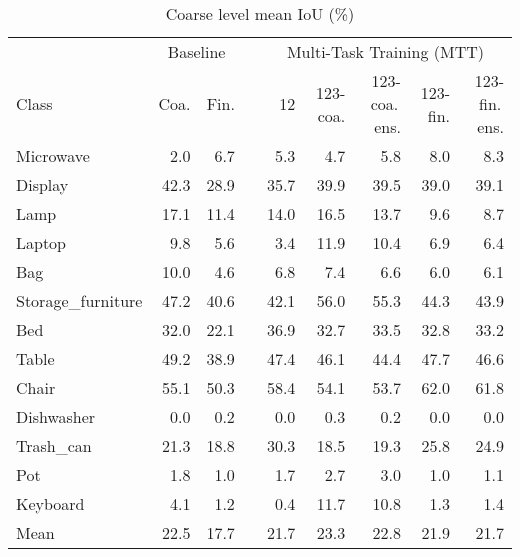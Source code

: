 \begin{table}[!h]
\caption{Coarse level mean IoU (\%)}
\centering
\begin{tabular}{lrrrrrrrr}
\toprule
 &  \multicolumn{2}{c}{Baseline} && \multicolumn{5}{c}{Multi-Task Training (MTT)} \\
 \cmidrule{2-3}
 \cmidrule{5-9}
Class 			  &  	 Coa. &  				Fin. &&  	12 &  		123-coa. &  		123-coa.\,ens. &  	  123-fin. &  123-fin.\,ens. \\
\midrule
Microwave         &       2.0 &                  6.7 &&     5.3 &             4.7 &                     5.8 &           8.0 &                   8.3 \\
Display           &      42.3 &                 28.9 &&    35.7 &            39.9 &                    39.5 &          39.0 &                  39.1 \\
Lamp              &      17.1 &                 11.4 &&    14.0 &            16.5 &                    13.7 &           9.6 &                   8.7 \\
Laptop            &       9.8 &                  5.6 &&     3.4 &            11.9 &                    10.4 &           6.9 &                   6.4 \\
Bag               &      10.0 &                  4.6 &&     6.8 &             7.4 &                     6.6 &           6.0 &                   6.1 \\
Storage\_furniture &      47.2 &                 40.6 &&    42.1 &            56.0 &                    55.3 &          44.3 &                  43.9 \\
Bed               &      32.0 &                 22.1 &&    36.9 &            32.7 &                    33.5 &          32.8 &                  33.2 \\
Table             &      49.2 &                 38.9 &&    47.4 &            46.1 &                    44.4 &          47.7 &                  46.6 \\
Chair             &      55.1 &                 50.3 &&    58.4 &            54.1 &                    53.7 &          62.0 &                  61.8 \\
Dishwasher        &       0.0 &                  0.2 &&     0.0 &             0.3 &                     0.2 &           0.0 &                   0.0 \\
Trash\_can         &      21.3 &                 18.8 &&    30.3 &            18.5 &                    19.3 &          25.8 &                  24.9 \\
Pot               &       1.8 &                  1.0 &&     1.7 &             2.7 &                     3.0 &           1.0 &                   1.1 \\
Keyboard          &       4.1 &                  1.2 &&     0.4 &            11.7 &                    10.8 &           1.3 &                   1.4 \\
\midrule
Mean              &      22.5 &                 17.7 &&    21.7 &            23.3 &                    22.8 &          21.9 &                  21.7 \\
\bottomrule
\end{tabular}
\label{suptbl:partseg-iou}
\end{table}


